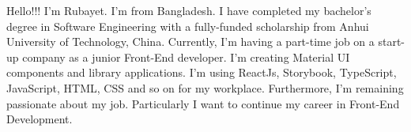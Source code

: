 
\par{
Hello!!! I'm Rubayet. I'm from Bangladesh. I have completed my bachelor's degree in Software Engineering with a fully-funded scholarship from Anhui University of Technology, China. Currently, I'm having a part-time job on a start-up company as a junior Front-End developer. I'm creating Material UI components and library applications. I'm using ReactJs, Storybook, TypeScript, JavaScript, HTML, CSS and so on for my workplace. Furthermore, I'm remaining passionate about my job. Particularly I want to continue my career in Front-End Development.
}
